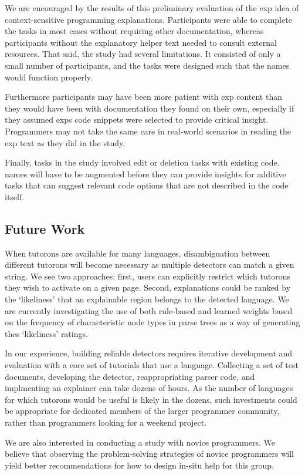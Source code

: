 We are encouraged by the results of this preliminary evaluation of the \gls{exp} idea of context-sensitive programming explanations.
Participants were able to complete the tasks in most cases without requiring other documentation, whereas participants without the explanatory helper text needed to consult external resources.
That said, the study had several limitations.  It consisted of only a small number of participants, and the tasks were designed such that the \Glspl{name} would function properly. 

Furthermore participants may have been more patient with \gls{exp} content than they would have been with documentation they found on their own, especially if they assumed \glspl{exp} code snippets were selected to provide critical insight.
Programmers may not take the same care in real-world scenarios in reading the \gls{exp} text as they did in the study.

Finally, tasks in the study involved edit or deletion tasks with existing code.
\Glspl{name} will have to be augmented before they can provide insights for additive tasks that can suggest relevant code options that are not described in the code itself.

\subsection{Future Work}

\begin{changes}
When tutorons are available for many languages, disambiguation between different tutorons will become necessary as multiple detectors can match a given string.
We see two approaches: first, users can explicitly restrict which tutorons they wish to activate on a given page.
Second, explanations could be ranked by the `likeliness' that an explainable region belongs to the detected language.
We are currently investigating the use of both rule-based and learned weights based on the frequency of characteristic node types in parse trees as a way of generating thes `likeliness' ratings.
\end{changes}

\begin{changes}
In our experience, building reliable detectors requires iterative development and evaluation with a core set of tutorials that use a language.
Collecting a set of test documents, developing the detector, reappropriating parser code, and implmenting an explainer can take dozens of hours.
As the number of languages for which tutorons would be useful is likely in the dozens, such investments could be appropriate for dedicated members of the larger programmer community, rather than programmers looking for a weekend project.
\end{changes}
\fi

We are also interested in conducting a study with novice programmers.
We believe that observing the problem-solving strategies of novice programmers will yield better recommendations for how to design in-situ help for this group.
